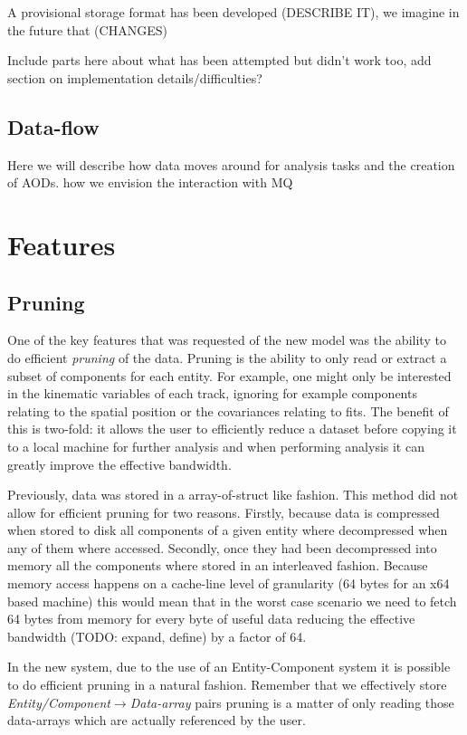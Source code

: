 \documentclass[a4paper]{report}
\begin{document}
\par A provisional storage format has been developed (DESCRIBE IT), we imagine in the future that (CHANGES)

Include parts here about what has been attempted but didn't work too, add section on implementation details/difficulties?

\subsection{Data-flow}
Here we will describe how data moves around for analysis tasks and the creation of AODs. how we envision the interaction with MQ

\newpage
\section{Features}
\subsection{Pruning}

One of the key features that was requested of the new model was the ability to do efficient {\em pruning} of the data. Pruning is the ability to only read or extract a
subset of components for each entity. For example, one might only be interested in the kinematic variables of each track, ignoring for example components relating to the spatial position or
the covariances relating to fits. The benefit of this is two-fold: it allows the user to efficiently reduce a dataset before copying it to a local machine for further analysis and when performing analysis
it can greatly improve the effective bandwidth.

\par Previously, data was stored in a array-of-struct like fashion. This method did not allow for efficient pruning for two reasons. Firstly, because data is compressed when stored to disk all components of a given
entity where decompressed when any of them where accessed.
 Secondly, once they had been decompressed into memory all the components where stored in an interleaved fashion. Because memory access happens on a cache-line level of granularity (64 bytes for an x64 based machine) this would mean that in the worst case scenario
 we need to fetch 64 bytes from memory for every byte of useful data reducing the effective bandwidth (TODO: expand, define) by a factor of 64.

 \par In the new system, due to the use of an Entity-Component system it is possible to do efficient pruning in a natural fashion. Remember that we effectively store
 {\em Entity/Component}$\to${\em Data-array} pairs pruning is a matter of only reading those data-arrays which are actually referenced by the user.
\end{document}

